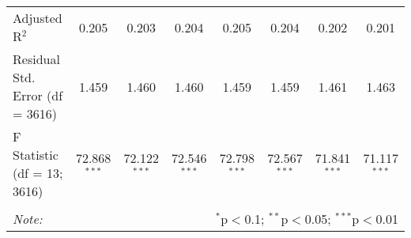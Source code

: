 \begin{table}[!htbp]
\begin{tabular}{@{\extracolsep{5pt}}lccccccc}
Adjusted R$^{2}$ & 0.205 & 0.203 & 0.204 & 0.205 & 0.204 & 0.202 & 0.201 \\ 
Residual Std. Error (df = 3616) & 1.459 & 1.460 & 1.460 & 1.459 & 1.459 & 1.461 & 1.463 \\ 
F Statistic (df = 13; 3616) & 72.868$^{***}$ & 72.122$^{***}$ & 72.546$^{***}$ & 72.798$^{***}$ & 72.567$^{***}$ & 71.841$^{***}$ & 71.117$^{***}$ \\ 
\hline 
\hline \\[-1.8ex] 
\textit{Note:}  & \multicolumn{7}{r}{$^{*}$p$<$0.1; $^{**}$p$<$0.05; $^{***}$p$<$0.01} \\ 
\end{tabular} 
\end{table} 
